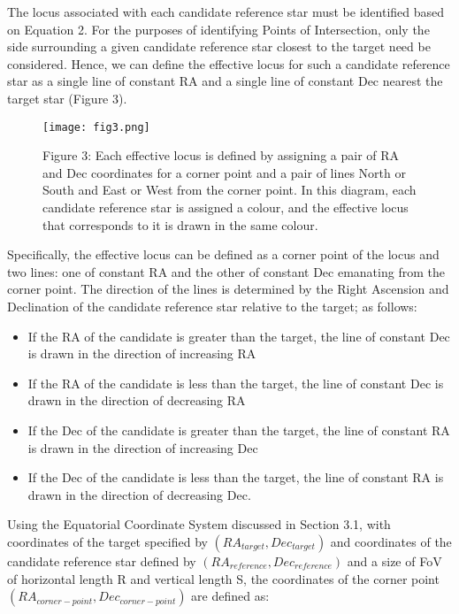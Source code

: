 \documentclass[]{elsarticle} %
\makeatletter
\providecommand{\tightlist}{%
  \setlength{\itemsep}{0pt}\setlength{\parskip}{0pt}}
\def\maxwidth{\ifdim\Gin@nat@width>\linewidth\linewidth
\else\Gin@nat@width\fi}
\let\Oldincludegraphics\includegraphics
\renewcommand{\includegraphics}[1]{\Oldincludegraphics[width=\maxwidth]{#1}}
\makeatother
\begin{document}
The locus associated with each candidate reference star must be
identified based on Equation 2. For the purposes of identifying Points
of Intersection, only the side surrounding a given candidate reference
star closest to the target need be considered. Hence, we can define the
effective locus for such a candidate reference star as a single line of
constant RA and a single line of constant Dec nearest the target star
(Figure 3).

\begin{figure}
\centering
\texttt{[image: fig3.png]}
\caption{Figure 3: Each effective locus is defined by assigning a pair
of RA and Dec coordinates for a corner point and a pair of lines North
or South and East or West from the corner point. In this diagram, each
candidate reference star is assigned a colour, and the effective locus
that corresponds to it is drawn in the same colour.}
\end{figure}

Specifically, the effective locus can be defined as a corner point of
the locus and two lines: one of constant RA and the other of constant
Dec emanating from the corner point. The direction of the lines is
determined by the Right Ascension and Declination of the candidate
reference star relative to the target; as follows:

\begin{itemize}
\tightlist
\item
  If the RA of the candidate is greater than the target, the line of
  constant Dec is drawn in the direction of increasing RA
\item
  If the RA of the candidate is less than the target, the line of
  constant Dec is drawn in the direction of decreasing RA
\item
  If the Dec of the candidate is greater than the target, the line of
  constant RA is drawn in the direction of increasing Dec
\item
  If the Dec of the candidate is less than the target, the line of
  constant RA is drawn in the direction of decreasing Dec.
\end{itemize}

Using the Equatorial Coordinate System discussed in Section 3.1, with
coordinates of the target specified by \((RA_{target}, Dec_{target})\)
and coordinates of the candidate reference star defined by
\((RA_{reference}, Dec_{reference})\) and a size of FoV of horizontal
length R and vertical length S, the coordinates of the corner point
\((RA_{corner-point}, Dec_{corner-point})\) are defined as:
\end{document}
